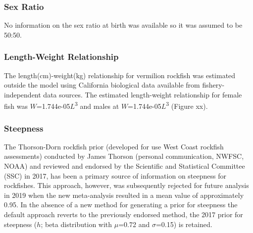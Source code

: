 \documentclass[11pt,
  english,
  a4paper,
]{article}
\begin{document}

\hypertarget{sex-ratio}{%
\subsubsection{Sex Ratio}\label{sex-ratio}}

\leavevmode\tagmcend\tagstructend

No information on the sex ratio at birth was available so it was assumed to be 50:50.


\hypertarget{length-weight-relationship}{%
\subsubsection{Length-Weight Relationship}\label{length-weight-relationship}}

\leavevmode\tagmcend\tagstructend

The length(cm)-weight(kg) relationship for vermilion rockfish was estimated outside the model using California biological data available from fishery-independent data sources. The estimated length-weight relationship for female fish was {\(W\)\leavevmode\tagmcend\tagstructend}=1.744e-05{\(L\)\leavevmode\tagmcend\tagstructend}\textsuperscript{3} and males at {\(W\)\leavevmode\tagmcend\tagstructend}=1.744e-05{\(L\)\leavevmode\tagmcend\tagstructend}\textsuperscript{3} (Figure xx).


\hypertarget{steepness}{%
\subsubsection{Steepness}\label{steepness}}

\leavevmode\tagmcend\tagstructend

The Thorson-Dorn rockfish prior (developed for use West Coast rockfish assessments) conducted by James Thorson (personal communication, NWFSC, NOAA) and reviewed and endorsed by the Scientific and Statistical Committee (SSC) in 2017, has been a primary source of information on steepness for rockfishes. This approach, however, was subsequently rejected for future analysis in 2019 when the new meta-analysis resulted in a mean value of approximately 0.95. In the absence of a new method for generating a prior for steepness the default approach reverts to the previously endorsed method, the 2017 prior for steepness ({\(h\)\leavevmode\tagmcend\tagstructend}; beta distribution with {\(\mu\)\leavevmode\tagmcend\tagstructend}=0.72 and {\(\sigma\)\leavevmode\tagmcend\tagstructend}=0.15) is retained.
\end{document}
